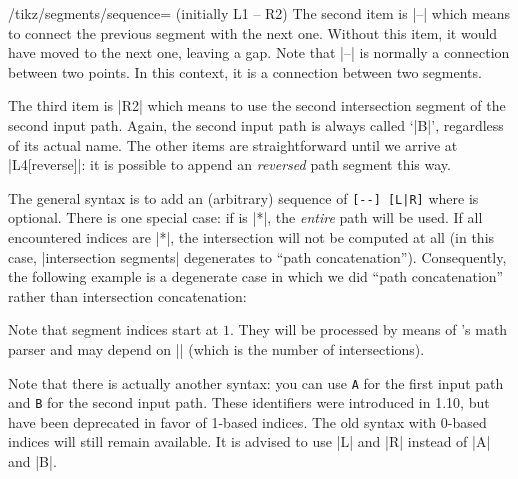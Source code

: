 {\begin{key}{/tikz/segments/sequence= (initially L1 -- R2)}
    The second item is |--| which means to connect the previous segment with
    the next one. Without this item, it would have moved to the next one,
    leaving a gap. Note that |--| is normally a connection between two points.
    In this context, it is a connection between two segments.

    The third item is |R2| which means to use the second intersection segment
    of the second input path. Again, the second input path is always called
    `|B|', regardless of its actual name. The other items are straightforward
    until we arrive at |L4[reverse]|: it is possible to append an
    \emph{reversed} path segment this way.

    The general syntax is to add an (arbitrary) sequence of \verb.[--] [L|R].
     where  is optional. There is
    one special case: if  is |*|, the \emph{entire} path will be
    used. If all encountered indices are |*|, the intersection will not be
    computed at all (in this case, |intersection segments| degenerates to
    ``path concatenation''). Consequently, the following example is a
    degenerate case in which we did ``path concatenation'' rather than
    intersection concatenation:
\begin{codeexample}[]
\end{codeexample}

    Note that segment indices start at $1$. They will be processed by means of
    \pgfname's math parser and may depend on |\pgfintersectionsolutions| (which
    is the number of intersections).

    Note that there is actually another syntax: you can use
    \texttt{A} for the first input path and
    \texttt{B} for the second input path. These identifiers
    were introduced in \PGFPlots{} 1.10, but have been deprecated in favor of
    1-based indices. The old syntax with 0-based indices will still remain
    available. It is advised to use |L| and |R| instead of |A| and |B|.


\end{key}}
